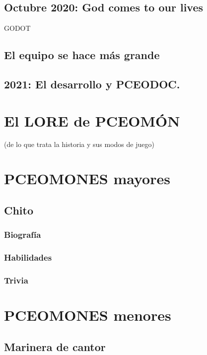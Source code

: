 \documentclass[letterpaper]{article}
\begin{document}
\subsection{Octubre 2020: God comes to our lives}

GODOT

\subsection{El equipo se hace más grande}

\subsection{2021: El desarrollo y PCEODOC.}

\section{El LORE de PCEOMÓN}
(de lo que trata la historia y sus modos de juego)

\section{PCEOMONES mayores}

\subsection{Chito}

\subsubsection{Biografía}

\subsubsection{Habilidades}

\subsubsection{Trivia}

\section{PCEOMONES menores}

\subsection{Marinera de cantor}
\end{document}
